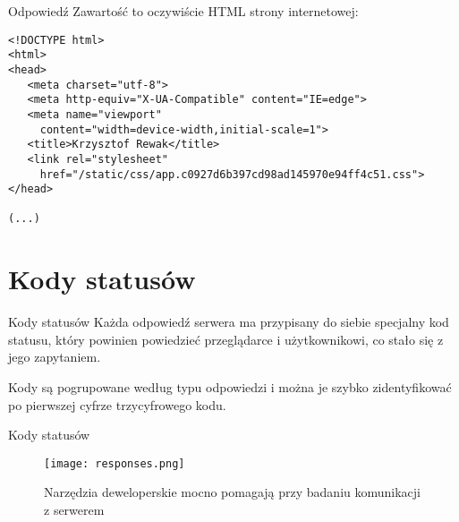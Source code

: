 \begin{frame}[fragile]{Odpowiedź}
	Zawartość to oczywiście HTML strony internetowej:

	\begin{lstlisting}
<!DOCTYPE html>
<html>
<head>
   <meta charset="utf-8">
   <meta http-equiv="X-UA-Compatible" content="IE=edge">
   <meta name="viewport"
     content="width=device-width,initial-scale=1">
   <title>Krzysztof Rewak</title>
   <link rel="stylesheet"
     href="/static/css/app.c0927d6b397cd98ad145970e94ff4c51.css">
</head>

(...)
	\end{lstlisting}
\end{frame}

\section{Kody statusów}

\begin{frame}{Kody statusów}
	Każda odpowiedź serwera ma przypisany do siebie specjalny kod statusu, który powinien powiedzieć przeglądarce i użytkownikowi, co stało się z jego zapytaniem.
	
	
	Kody są pogrupowane według typu odpowiedzi i można je szybko zidentyfikować po pierwszej cyfrze trzycyfrowego kodu.
\end{frame}

\begin{frame}{Kody statusów}
	\begin{figure}[t]
		\centering
		\texttt{[image: responses.png]}
		\caption{Narzędzia deweloperskie mocno pomagają przy badaniu komunikacji z serwerem}
	\end{figure}
\end{frame}

